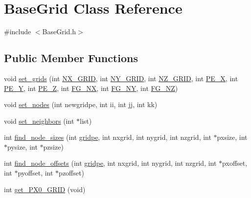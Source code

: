\hypertarget{class_base_grid}{\section{Base\-Grid Class Reference}
\label{class_base_grid}
}


{\ttfamily \#include $<$Base\-Grid.\-h$>$}

\subsection*{Public Member Functions}
\begin{DoxyCompactItemize}
\item 
void \hyperlink{class_base_grid_a3744544e59df25db3d80c35595f281ca}{set\-\_\-grids} (int \hyperlink{class_base_grid_a7548700bafe00f4dc83c9aa9b210af9f}{N\-X\-\_\-\-G\-R\-I\-D}, int \hyperlink{class_base_grid_a2cbc204f1d85502e73427a97d9def80e}{N\-Y\-\_\-\-G\-R\-I\-D}, int \hyperlink{class_base_grid_aaffbb314d36e8a39b245570286b04683}{N\-Z\-\_\-\-G\-R\-I\-D}, int \hyperlink{class_base_grid_a360515bb70e6cb44d9d52040cd146b56}{P\-E\-\_\-\-X}, int \hyperlink{class_base_grid_af598137aa30afd974f1113a3a287122e}{P\-E\-\_\-\-Y}, int \hyperlink{class_base_grid_a54b187f8615fff7d8ed3ba2e58ffc95c}{P\-E\-\_\-\-Z}, int \hyperlink{class_base_grid_ae2f8fc9fc2edbad1fbabf64d015bb47e}{F\-G\-\_\-\-N\-X}, int \hyperlink{class_base_grid_a514a9d96f0e6705ddc362c3283104c00}{F\-G\-\_\-\-N\-Y}, int \hyperlink{class_base_grid_a70dbc692098fece70703bb0113b33ca9}{F\-G\-\_\-\-N\-Z})
\item 
void \hyperlink{class_base_grid_af86e576ee359e3c9745169bd7a2cceec}{set\-\_\-nodes} (int newgridpe, int ii, int jj, int kk)
\item 
void \hyperlink{class_base_grid_a88467229662ad58dde8166613d26a831}{set\-\_\-neighbors} (int $\ast$list)
\item 
int \hyperlink{class_base_grid_a55ed0827cc65dadc112e988ea6c0c755}{find\-\_\-node\-\_\-sizes} (int \hyperlink{class_base_grid_a50dfa474999fe8be113d27619f102283}{gridpe}, int nxgrid, int nygrid, int nzgrid, int $\ast$pxsize, int $\ast$pysize, int $\ast$pzsize)
\item 
int \hyperlink{class_base_grid_add9831e95fe2b6318677f825223e006d}{find\-\_\-node\-\_\-offsets} (int \hyperlink{class_base_grid_a50dfa474999fe8be113d27619f102283}{gridpe}, int nxgrid, int nygrid, int nzgrid, int $\ast$pxoffset, int $\ast$pyoffset, int $\ast$pzoffset)
\item 
int \hyperlink{class_base_grid_ac5bf57ff1925398cd6f812387417262c}{get\-\_\-\-P\-X0\-\_\-\-G\-R\-I\-D} (void)

\end{DoxyCompactItemize}
